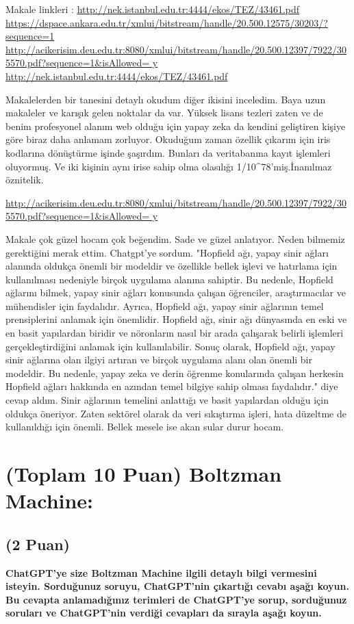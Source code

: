 \documentclass[11pt]{article}
\begin{document}
Makale linkleri :
\url{http://nek.istanbul.edu.tr:4444/ekos/TEZ/43461.pdf}
\url{https://dspace.ankara.edu.tr/xmlui/bitstream/handle/20.500.12575/30203/?sequence=1}
\url{http://acikerisim.deu.edu.tr:8080/xmlui/bitstream/handle/20.500.12397/7922/305570.pdf?sequence=1&isAllowed= y}
\url{http://nek.istanbul.edu.tr:4444/ekos/TEZ/43461.pdf}

Makalelerden bir tanesini detaylı okudum diğer ikisini inceledim. Baya uzun makaleler ve karışık gelen noktalar da var. Yüksek lisans tezleri zaten ve de benim profesyonel alanım web olduğu için yapay zeka da kendini geliştiren kişiye göre biraz daha anlamam zorluyor. Okuduğum zaman özellik çıkarım için iris kodlarına dönüştürme işinde şaşırdım. Bunları da veritabanına kayıt işlemleri oluyormuş. Ve iki kişinin aynı irise sahip olma olasılığı 1/10^78'miş.İnanılmaz öznitelik. 

\url{http://acikerisim.deu.edu.tr:8080/xmlui/bitstream/handle/20.500.12397/7922/305570.pdf?sequence=1&isAllowed= y}

Makale çok güzel hocam çok beğendim. Sade ve güzel anlatıyor. Neden bilmemiz gerektiğini merak ettim. Chatgpt'ye sordum.
"Hopfield ağı, yapay sinir ağları alanında oldukça önemli bir modeldir ve özellikle bellek işlevi ve hatırlama için kullanılması nedeniyle birçok uygulama alanına sahiptir. Bu nedenle, Hopfield ağlarını bilmek, yapay sinir ağları konusunda çalışan öğrenciler, araştırmacılar ve mühendisler için faydalıdır.
Ayrıca, Hopfield ağı, yapay sinir ağlarının temel prensiplerini anlamak için önemlidir. Hopfield ağı, sinir ağı dünyasında en eski ve en basit yapılardan biridir ve nöronların nasıl bir arada çalışarak belirli işlemleri gerçekleştirdiğini anlamak için kullanılabilir.
Sonuç olarak, Hopfield ağı, yapay sinir ağlarına olan ilgiyi artıran ve birçok uygulama alanı olan önemli bir modeldir. Bu nedenle, yapay zeka ve derin öğrenme konularında çalışan herkesin Hopfield ağları hakkında en azından temel bilgiye sahip olması faydalıdır." diye cevap aldım. Sinir ağlarının temelini anlattığı ve basit yapılardan olduğu için oldukça öneriyor. Zaten sektörel olarak da veri sıkıştırma işleri, hata düzeltme de kullanıldığı için önemli. Bellek mesele ise akan sular durur hocam.

\section{(Toplam 10 Puan) Boltzman Machine:}

\subsection{(2 Puan)} \textbf{ChatGPT’ye size Boltzman Machine ilgili detaylı bilgi vermesini isteyin. Sorduğunuz soruyu, ChatGPT'nin çıkartığı cevabı aşağı koyun. Bu cevapta anlamadığınız terimleri de ChatGPT’ye sorup, sorduğunuz soruları ve ChatGPT’nin verdiği cevapları da sırayla aşağı koyun.}
\end{document}
